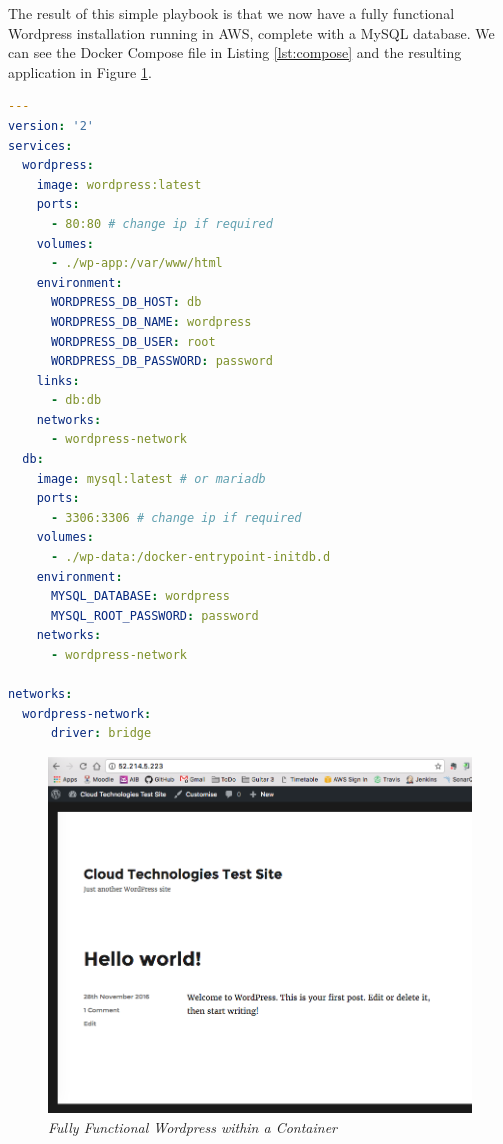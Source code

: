 \documentclass{article}
\begin{document}
The result of this simple playbook is that we now have a fully functional Wordpress installation running in AWS, complete with a MySQL database. We can see the Docker Compose file in Listing \ref{lst:compose} and the resulting application in Figure \ref{fig:wordpress}.

\begin{lstlisting}[float,floatplacement=!htbp,language=yaml,caption={docker-compose.yml Credit: (Nezbeda, 2016)},label={lst:compose},basicstyle=\scriptsize]
---
version: '2'
services:
  wordpress:
    image: wordpress:latest
    ports:
      - 80:80 # change ip if required
    volumes:
      - ./wp-app:/var/www/html
    environment:
      WORDPRESS_DB_HOST: db
      WORDPRESS_DB_NAME: wordpress
      WORDPRESS_DB_USER: root
      WORDPRESS_DB_PASSWORD: password
    links:
      - db:db
    networks:
      - wordpress-network
  db:
    image: mysql:latest # or mariadb
    ports:
      - 3306:3306 # change ip if required
    volumes:
      - ./wp-data:/docker-entrypoint-initdb.d
    environment:
      MYSQL_DATABASE: wordpress
      MYSQL_ROOT_PASSWORD: password
    networks:
      - wordpress-network

networks:
  wordpress-network:
      driver: bridge
\end{lstlisting}

\begin{figure}[!h]
\centering
\includegraphics*[width=\textwidth]{components/images/wordpress}
\caption{\em Fully Functional Wordpress within a Container}
\label{fig:wordpress}
\end{figure}
\end{document}
